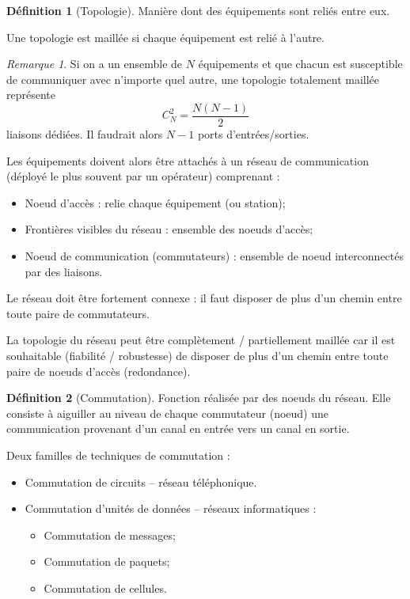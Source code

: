 \documentclass[11pt,english,french]{scrreprt}
\theoremstyle{remark}
\newtheorem*{rem*}{Remarque}
\theoremstyle{definition}
\newtheorem*{def*}{Définition}
\begin{document}
\begin{def*}[Topologie]
	Manière dont des équipements sont reliés entre eux.
	
	Une topologie est maillée si chaque équipement est relié à l'autre.
\end{def*}

\begin{rem*}
	Si on a un ensemble de $N$ équipements et que chacun est susceptible de communiquer avec n'importe quel autre, une topologie totalement maillée représente \[
	C_N^2=\frac{N(N-1)}{2}
\] liaisons dédiées. Il faudrait alors $N-1$ ports d'entrées/sorties.
\end{rem*}

Les équipements doivent alors être attachés à un réseau de communication (déployé le plus souvent par un opérateur) comprenant :\begin{itemize}
	\item Noeud d'accès : relie chaque équipement (ou station);
	\item Frontières visibles du réseau : ensemble des noeuds d'accès;
	\item Noeud de communication (commutateurs) : ensemble de noeud interconnectés par des liaisons.
\end{itemize}

Le réseau doit être fortement connexe : il faut disposer de plus d'un chemin entre toute paire de commutateurs. 

La topologie du réseau peut être complètement / partiellement maillée car il est souhaitable (fiabilité / robustesse) de disposer de plus d'un chemin entre toute paire de noeuds d'accès (redondance).

\begin{def*}[Commutation]
	Fonction réalisée par des noeuds du réseau. Elle consiste à aiguiller au niveau de chaque commutateur (noeud) une communication provenant d'un canal en entrée vers un canal en sortie.
	
	Deux familles de techniques de commutation :\begin{itemize}
		\item Commutation de circuits  -- réseau téléphonique.
		\item Commutation d'unités de données -- réseaux informatiques :\begin{itemize}
			\item Commutation de messages;
			\item Commutation de paquets;
			\item Commutation de cellules.
		\end{itemize}
	\end{itemize} 
\end{def*}
\end{document}
